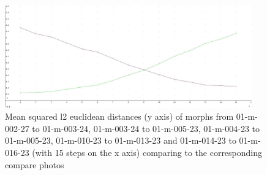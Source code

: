 \begin{figure}[htbp] 
	\centering
		\includegraphics[width=0.95\textwidth]{Resources/result1-5-mean.jpg}
	\caption{Mean squared l2 euclidean distances (y axis) of morphs from 01-m-002-27 to 01-m-003-24, 01-m-003-24 to 01-m-005-23, 01-m-004-23 to 01-m-005-23, 01-m-010-23 to 01-m-013-23 and 01-m-014-23 to 01-m-016-23 (with 15 steps on the x axis) comparing to the corresponding compare photos}
	\label{fig:Result1-5-mean}
\end{figure}
\newpage
